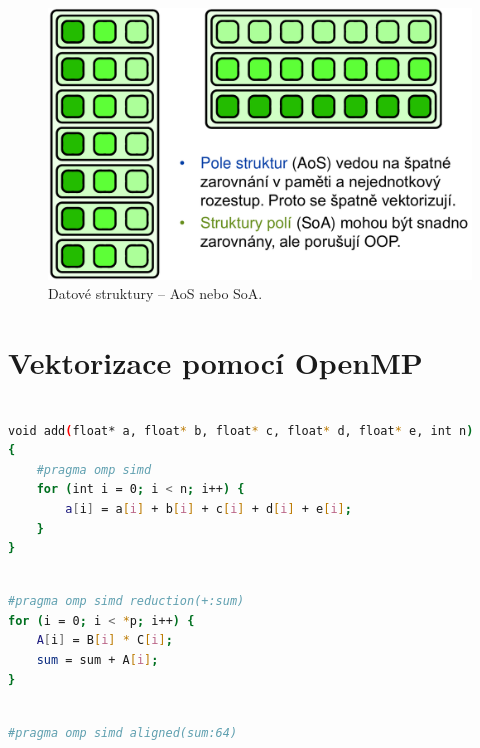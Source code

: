 \begin{compactitem}
    \begin{figure}[H]
        \centering
        \includegraphics[width=0.85\linewidth]{datove_struktury.pdf}
        \caption{Datové struktury -- AoS nebo SoA.}
    \end{figure}
\end{compactitem}


\section{Vektorizace pomocí OpenMP}

\noindent\begin{minipage}{\linewidth}
\begin{lstlisting}[language=bash, caption={Obyčejná smyčka.}]

void add(float* a, float* b, float* c, float* d, float* e, int n)
{
    #pragma omp simd
    for (int i = 0; i < n; i++) {
        a[i] = a[i] + b[i] + c[i] + d[i] + e[i];
    }
}

\end{lstlisting}
\end{minipage}

\noindent\begin{minipage}{\linewidth}
\begin{lstlisting}[language=bash, caption={Redukce, po skončení vektorovýho výpočtu posčítá mezivýsledky.}]

#pragma omp simd reduction(+:sum)
for (i = 0; i < *p; i++) {
    A[i] = B[i] * C[i];
    sum = sum + A[i];
}

\end{lstlisting}
\end{minipage}

\noindent\begin{minipage}{\linewidth}
\begin{lstlisting}[language=bash, caption={Aligned, dané proměnné jsou zarovnány na počet bytů.}]

#pragma omp simd aligned(sum:64)

\end{lstlisting}
\end{minipage}


